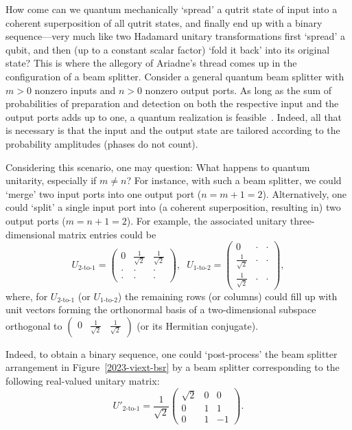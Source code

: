 \documentclass[%
 superscriptaddress,
  preprint,
 showpacs,
 showkeys,
 nofootinbib,
  amsmath,amssymb,
 pra,
  longbibliography,
  floatfix,
 ]{revtex4-2}
\theoremstyle{definition}
\begin{document}
How come can we quantum mechanically `spread' a  qutrit state of input  into a coherent superposition of all qutrit states,
and finally end up with a binary sequence---very much like two Hadamard unitary transformations first `spread' a qubit,
and then (up to a constant scalar factor) `fold it back' into its original state?
This is where the allegory of Ariadne's thread comes up in the configuration of a beam splitter.
Consider a general quantum beam splitter with $m>0$ nonzero inputs and $n>0$ nonzero output ports.
As long as the sum of probabilities of preparation and detection on both the respective input and the output ports adds up to one,
a quantum realization is feasible~\cite{reck-94,rzbb,%
de_Guise_2018}. Indeed, all that is necessary
is that the input and the output state are tailored according to the probability amplitudes (phases do not count).

Considering this scenario, one may question:
What happens to quantum unitarity, especially if $m \neq n$?
For instance, with such a beam splitter, we could `merge' two input ports into one output port ($n=m+1=2$).
 Alternatively, one could `split' a single input port into (a coherent superposition, resulting in) two output ports ($m=n+1=2$).
For example, the associated unitary three-dimensional matrix entries could be
\begin{equation}
U_{\text{2-to-1}}=
\begin{pmatrix}
0&\frac{1}{\sqrt{2}}&\frac{1}{\sqrt{2}} \\
\cdot&\cdot&\cdot \\
\cdot&\cdot&\cdot
\end{pmatrix}
,\phantom{x}%
U_{\text{1-to-2}}=
\begin{pmatrix}
0&\cdot&\cdot \\
\frac{1}{\sqrt{2}}&\cdot&\cdot \\
\frac{1}{\sqrt{2}}&\cdot&\cdot
\end{pmatrix},
\end{equation}
where, for $U_{\text{2-to-1}}$ (or $U_{\text{1-to-2}}$)
the remaining rows (or columns) could fill up with unit vectors forming the orthonormal basis of a two-dimensional subspace orthogonal to
$
\begin{pmatrix}
0&\frac{1}{\sqrt{2}}&\frac{1}{\sqrt{2}}
\end{pmatrix}
$
(or its Hermitian conjugate).


Indeed, to obtain a binary sequence, one could `post-process' the beam splitter arrangement  in
Figure~\ref{2023-viext-bsr} by a beam splitter corresponding to the following real-valued unitary matrix:
\begin{equation}
%
U'_{\text{2-to-1}}=
\frac{1}{\sqrt{2}}
\begin{pmatrix}
\sqrt{2}&0&0\\
0&1&1 \\
0&1&-1
\end{pmatrix}
.
\label{2023-viext-ub1to}
\end{equation}
\end{document}
